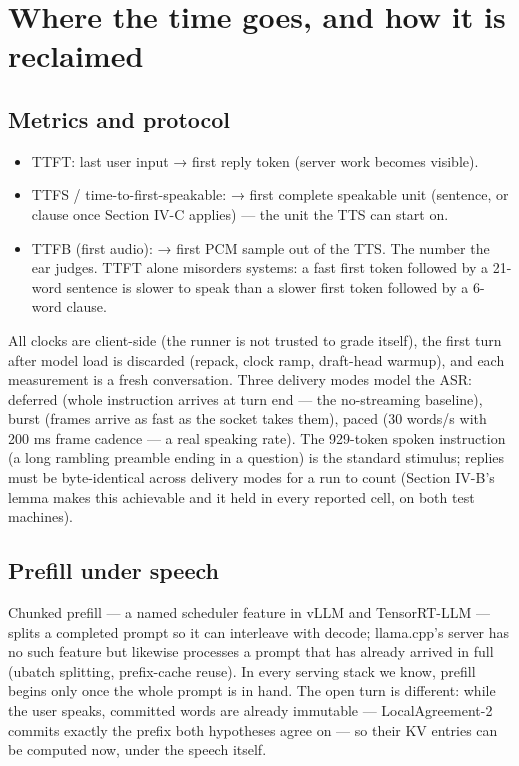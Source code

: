 \documentclass[journal]{IEEEtran}
\begin{document}
\section{Where the time goes, and how it is reclaimed}

\subsection{Metrics and protocol}


    \begin{itemize}
        \item TTFT: last user input → first reply token (server work becomes visible).
        \item TTFS / time-to-first-speakable: → first complete speakable unit (sentence, or clause once Section IV-C applies) — the unit the TTS can start on.
        \item TTFB (first audio): → first PCM sample out of the TTS. The number the ear judges. TTFT alone misorders systems: a fast first token followed by a 21-word sentence is slower to speak than a slower first token followed by a 6-word clause.
    \end{itemize}

All clocks are client-side (the runner is not trusted to grade itself), the first turn after model load is discarded (repack, clock ramp, draft-head warmup), and each measurement is a fresh conversation. Three delivery modes model the ASR: deferred (whole instruction arrives at turn end — the no-streaming baseline), burst (frames arrive as fast as the socket takes them), paced (30 words/s with 200 ms frame cadence — a real speaking rate). The 929-token spoken instruction (a long rambling preamble ending in a question) is the standard stimulus; replies must be byte-identical across delivery modes for a run to count (Section IV-B's lemma makes this achievable and it held in every reported cell, on both test machines).

\subsection{Prefill under speech}

Chunked prefill — a named scheduler feature in vLLM and TensorRT-LLM — splits a completed prompt so it can interleave with decode; llama.cpp's server has no such feature but likewise processes a prompt that has already arrived in full (ubatch splitting, prefix-cache reuse). In every serving stack we know, prefill begins only once the whole prompt is in hand. The open turn is different: while the user speaks, committed words are already immutable — LocalAgreement-2 commits exactly the prefix both hypotheses agree on — so their KV entries can be computed now, under the speech itself.
\end{document}
